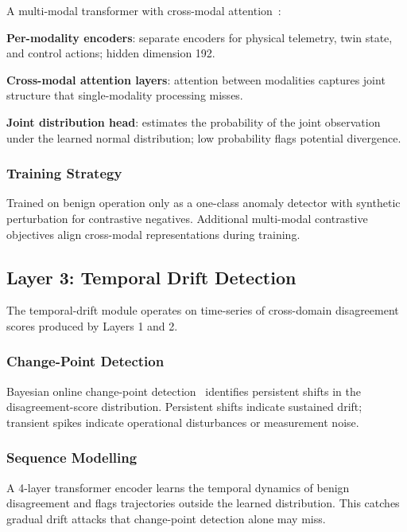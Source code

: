\documentclass[sigconf,nonacm]{acmart}
\begin{document}
A multi-modal transformer with cross-modal
attention~\cite{tsai2019multimodal}:

\textbf{Per-modality encoders}: separate encoders for physical
telemetry, twin state, and control actions; hidden dimension 192.

\textbf{Cross-modal attention layers}: attention between modalities
captures joint structure that single-modality processing
misses.

\textbf{Joint distribution head}: estimates the probability of
the joint observation under the learned normal distribution;
low probability flags potential divergence.

\subsubsection{Training Strategy}

Trained on benign operation only as a one-class anomaly detector
with synthetic perturbation for contrastive negatives. Additional
multi-modal contrastive objectives align cross-modal representations
during training.

\subsection{Layer 3: Temporal Drift Detection}

The temporal-drift module operates on time-series of cross-domain
disagreement scores produced by Layers 1 and 2.

\subsubsection{Change-Point Detection}

Bayesian online change-point detection~\cite{aminikhanghahi2024changepoint}
identifies persistent shifts in the disagreement-score distribution.
Persistent shifts indicate sustained drift; transient
spikes indicate operational disturbances or measurement noise.

\subsubsection{Sequence Modelling}

A 4-layer transformer encoder learns the temporal dynamics of
benign disagreement and flags trajectories outside the learned
distribution. This catches gradual drift attacks that
change-point detection alone may miss.
\end{document}
